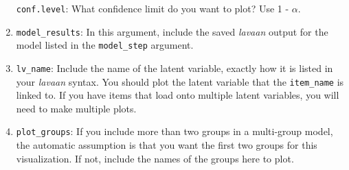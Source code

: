 \documentclass[
  man]{apa7}
\newenvironment{Shaded}{\begin{snugshade}}{\end{snugshade}}
\newcommand{\AttributeTok}[1]{\textcolor[rgb]{0.13,0.29,0.53}{#1}}
\newcommand{\CommentTok}[1]{\textcolor[rgb]{0.56,0.35,0.01}{\textit{#1}}}
\newcommand{\DecValTok}[1]{\textcolor[rgb]{0.00,0.00,0.81}{#1}}
\newcommand{\FunctionTok}[1]{\textcolor[rgb]{0.13,0.29,0.53}{\textbf{#1}}}
\newcommand{\NormalTok}[1]{#1}
\newcommand{\OtherTok}[1]{\textcolor[rgb]{0.56,0.35,0.01}{#1}}
\newcommand{\SpecialCharTok}[1]{\textcolor[rgb]{0.81,0.36,0.00}{\textbf{#1}}}
\newcommand{\StringTok}[1]{\textcolor[rgb]{0.31,0.60,0.02}{#1}}
\begin{document}
\begin{enumerate}
  \texttt{conf.level}: What confidence limit do you want to plot? Use 1 - \(\alpha\).
\item
  \texttt{model\_results}: In this argument, include the saved \emph{lavaan} output for the model listed in the \texttt{model\_step} argument.
\item
  \texttt{lv\_name}: Include the name of the latent variable, exactly how it is listed in your \emph{lavaan} syntax. You should plot the latent variable that the \texttt{item\_name} is linked to. If you have items that load onto multiple latent variables, you will need to make multiple plots.
\item
  \texttt{plot\_groups}: If you include more than two groups in a multi-group model, the automatic assumption is that you want the first two groups for this visualization. If not, include the names of the groups here to plot.
\end{enumerate}

\small

\begin{Shaded}
\end{Shaded}
\end{document}
